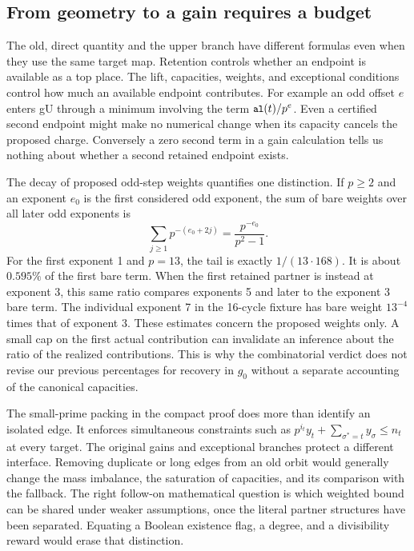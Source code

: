 \documentclass[12pt,letterpaper]{article}
\DeclareRobustCommand{\id}[1]{\mbox{\small\ttfamily #1}}
\begin{document}
\subsection{From geometry to a gain requires a budget}

The old, direct quantity and the upper branch have different formulas even when they use the same target map. Retention controls whether an endpoint is available as a top place. The lift, capacities, weights, and exceptional conditions control how much an available endpoint contributes. For example an odd offset $e$ enters \id{gU} through a minimum involving the term $\id{al}(t)/p^e$. Even a certified second endpoint might make no numerical change when its capacity cancels the proposed charge. Conversely a zero second term in a gain calculation tells us nothing about whether a second retained endpoint exists.

The decay of proposed odd-step weights quantifies one distinction. If $p\ge2$ and an exponent $e_0$ is the first considered odd exponent, the sum of bare weights over all later odd exponents is
\begin{equation}
 \sum_{j\ge1}p^{-(e_0+2j)}
              =\frac{p^{-e_0}}{p^2-1}.
 \label{eq:tail}
\end{equation}
For the first exponent 1 and $p=13$, the tail is exactly $1/(13\cdot168)$. It is about $0.595\%$ of the first bare term. When the first retained partner is instead at exponent 3, this same ratio compares exponents 5 and later to the exponent 3 bare term. The individual exponent 7 in the 16-cycle fixture has bare weight $13^{-4}$ times that of exponent 3. These estimates concern the proposed weights only. A small cap on the first actual contribution can invalidate an inference about the ratio of the realized contributions. This is why the combinatorial verdict does not revise our previous percentages for recovery in \(g_0\) without a separate accounting of the canonical capacities.

The small-prime packing in the compact proof does more than identify an isolated edge. It enforces simultaneous constraints such as \(p^{i_t}y_t+\sum_{\sigma^\ast=t}y_\sigma\le n_t\) at every target. The original gains and exceptional branches protect a different interface. Removing duplicate or long edges from an old orbit would generally change the mass imbalance, the saturation of capacities, and its comparison with the fallback. The right follow-on mathematical question is which weighted bound can be shared under weaker assumptions, once the literal partner structures have been separated. Equating a Boolean existence flag, a degree, and a divisibility reward would erase that distinction.
\end{document}
